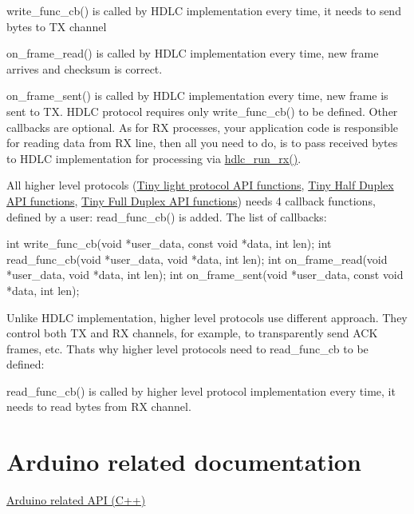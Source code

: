 \begin{DoxyItemize}
\item write\+\_\+func\+\_\+cb() is called by H\+D\+LC implementation every time, it needs to send bytes to TX channel
\item on\+\_\+frame\+\_\+read() is called by H\+D\+LC implementation every time, new frame arrives and checksum is correct.
\item on\+\_\+frame\+\_\+sent() is called by H\+D\+LC implementation every time, new frame is sent to TX. H\+D\+LC protocol requires only write\+\_\+func\+\_\+cb() to be defined. Other callbacks are optional. As for RX processes, your application code is responsible for reading data from RX line, then all you need to do, is to pass received bytes to H\+D\+LC implementation for processing via \hyperlink{group__HDLC__API_ga911a3f1cb32dd6cadd00223e0097642c}{hdlc\+\_\+run\+\_\+rx()}.
\end{DoxyItemize}

All higher level protocols (\hyperlink{group__LIGHT__API}{Tiny light protocol A\+PI functions}, \hyperlink{group__HALF__DUPLEX__API}{Tiny Half Duplex A\+PI functions}, \hyperlink{group__FULL__DUPLEX__API}{Tiny Full Duplex A\+PI functions}) needs 4 callback functions, defined by a user\+: read\+\_\+func\+\_\+cb() is added. The list of callbacks\+:


\begin{DoxyCode}
\textcolor{keywordtype}{int} write\_func\_cb(\textcolor{keywordtype}{void} *user\_data, \textcolor{keyword}{const} \textcolor{keywordtype}{void} *data, \textcolor{keywordtype}{int} len);
\textcolor{keywordtype}{int} read\_func\_cb(\textcolor{keywordtype}{void} *user\_data, \textcolor{keywordtype}{void} *data, \textcolor{keywordtype}{int} len);
\textcolor{keywordtype}{int} on\_frame\_read(\textcolor{keywordtype}{void} *user\_data, \textcolor{keywordtype}{void} *data, \textcolor{keywordtype}{int} len);
\textcolor{keywordtype}{int} on\_frame\_sent(\textcolor{keywordtype}{void} *user\_data, \textcolor{keyword}{const} \textcolor{keywordtype}{void} *data, \textcolor{keywordtype}{int} len);
\end{DoxyCode}


Unlike H\+D\+LC implementation, higher level protocols use different approach. They control both TX and RX channels, for example, to transparently send A\+CK frames, etc. That\textquotesingle{}s why higher level protocols need to read\+\_\+func\+\_\+cb to be defined\+:


\begin{DoxyItemize}
\item read\+\_\+func\+\_\+cb() is called by higher level protocol implementation every time, it needs to read bytes from RX channel.
\end{DoxyItemize}\hypertarget{index_arduino_section}{}\section{Arduino related documentation}\label{index_arduino_section}
\hyperlink{arduino}{Arduino related A\+PI (C++)} 